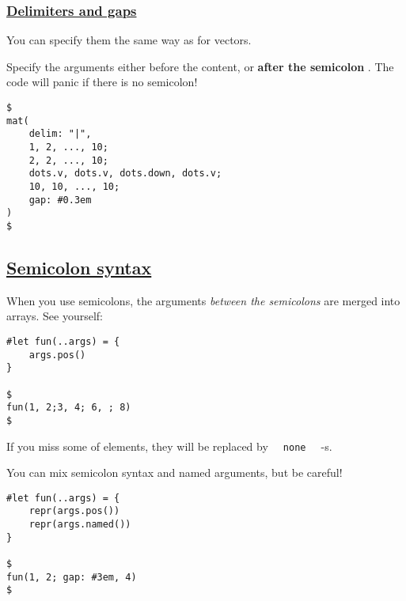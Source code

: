 \subsubsection{\texorpdfstring{\hyperref[delimiters-and-gaps]{Delimiters
and gaps}}{Delimiters and gaps}}\label{delimiters-and-gaps}

You can specify them the same way as for vectors.

Specify the arguments either before the content, or \textbf{after the
semicolon} . The code will panic if there is no semicolon!

\begin{verbatim}
$
mat(
    delim: "|",
    1, 2, ..., 10;
    2, 2, ..., 10;
    dots.v, dots.v, dots.down, dots.v;
    10, 10, ..., 10;
    gap: #0.3em
)
$
\end{verbatim}

\pandocbounded{}

\subsection{\texorpdfstring{\hyperref[semicolon-syntax]{Semicolon
syntax}}{Semicolon syntax}}\label{semicolon-syntax}

When you use semicolons, the arguments \emph{between the semicolons} are
merged into arrays. See yourself:

\begin{verbatim}
#let fun(..args) = {
    args.pos()
}

$
fun(1, 2;3, 4; 6, ; 8)
$
\end{verbatim}

\pandocbounded{}

If you miss some of elements, they will be replaced by
\texttt{\ }{\texttt{\ none\ }}\texttt{\ } -s.

You can mix semicolon syntax and named arguments, but be careful!

\begin{verbatim}
#let fun(..args) = {
    repr(args.pos())
    repr(args.named())
}

$
fun(1, 2; gap: #3em, 4)
$
\end{verbatim}

\pandocbounded{}

